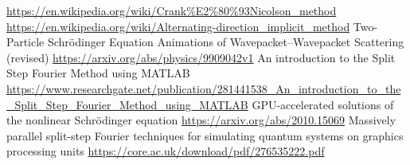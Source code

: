 \documentclass[11pt]{report}
\begin{document}
\newpage

\begin{thebibliography}{99}
	\setlength{\itemsep}{.2\itemsep}\setlength{\parsep}{.5\parsep}
	 \url{https://en.wikipedia.org/wiki/Crank%E2%80%93Nicolson_method}
	 \url{https://en.wikipedia.org/wiki/Alternating-direction_implicit_method}
	 Two-Particle Schr\" odinger Equation Animations of Wavepacket–Wavepacket Scattering (revised) \url{https://arxiv.org/abs/physics/9909042v1}
	 An introduction to the Split Step Fourier Method using MATLAB \url{https://www.researchgate.net/publication/281441538_An_introduction_to_the_Split_Step_Fourier_Method_using_MATLAB}
	 GPU-accelerated solutions of the nonlinear Schr\" odinger equation \url{https://arxiv.org/abs/2010.15069}
	 Massively parallel split-step Fourier techniques for simulating quantum systems on graphics processing units \url{https://core.ac.uk/download/pdf/276535222.pdf}
\end{thebibliography}
\end{document}
